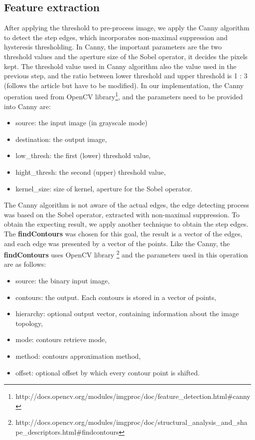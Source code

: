 \subsection{Feature extraction}
After applying the threshold to pre-process image, we apply the Canny algorithm to detect the step edges, which incorporates non-maximal suppression and hysteresis thresholding. In Canny, the important parameters are the two threshold values and the aperture size of the Sobel operator, it decides the pixels kept. The threshold value used in Canny algorithm also the value used in the previous step, and the ratio between lower threshold and upper threshold is 1 : 3 (follows the article \cite{palaniswamy2010automatic} but have to be modified). In our implementation, the Canny operation used from OpenCV library\footnote{http://docs.opencv.org/modules/imgproc/doc/feature\_detection.html\#canny}, and the parameters need to be provided into Canny are:
\begin{itemize}
\item source: the input image (in grayscale mode)
\item destination: the output image,
\item low\_thresh: the first (lower) threshold value,
\item hight\_thresh: the second (upper) threshold value,
\item kernel\_size: size of kernel, aperture for the Sobel operator.
\end{itemize}
The Canny algorithm is not aware of the actual edges, the edge detecting process was based on the Sobel operator, extracted with non-maximal suppression. To obtain the expecting result, we apply another technique to obtain the step edges. The \textbf{findContours} was chosen for this goal, the result is a vector of the edges, and each edge was presented by a vector of the points. Like the Canny, the \textbf{findContours} uses OpenCV library \footnote{http://docs.opencv.org/modules/imgproc/doc/structural\_analysis\_and\_shape\_descriptors.html\#findcontours} and the parameters used in this operation are as follows:
\begin{itemize}
\item source: the binary input image,
\item contours: the output. Each contours is stored in a vector of points,
\item hierarchy: optional output vector, containing information about the image topology,
\item mode: contours retrieve mode,
\item method: contours approximation method,
\item offset: optional offset by which every contour point is shifted.
\end{itemize}
